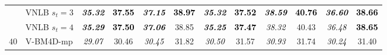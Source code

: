 \documentclass[10pt, journal, twocolumn, final, a4paper]{IEEEtran}
\newcommand{\best}[1]{#1}
\newcommand{\bsic}[1]{\textcolor{black}{\textit{#1}}}
\newcommand{\Bsic}[1]{\textcolor{black}{\textbf{\textit{#1}}}}
\newcommand{\Best}[1]{\textbf{\textcolor{black}{#1}}}
\begin{document}
\begin{table}[htp!]
\begin{center}
{\begin{tabular}{ c | l |c c | c c | c c | c c | c c}
			                      & VNLB   $s_t = 3$     & \Bsic{35.32} & \Best{37.55} & \Bsic{37.15} & \Best{38.97} & \Bsic{35.32} & \Best{37.52} & \Bsic{38.59} & \Best{40.76} & \Bsic{36.60} & \Best{38.66} \\
			                      & VNLB   $s_t = 4$     & \Bsic{35.29} & \Best{37.50} & \Bsic{37.06} & \best{38.85} & \Bsic{35.25} & \Best{37.47} & \bsic{38.32} & \best{40.43} & \bsic{36.48} & \Best{38.65} \\\hline
%
			\multirow{1}{*}{$40$}
			                      & V-BM4D-mp            & \bsic{29.07} &       30.46  & \bsic{30.45} &       31.82  & \bsic{30.50} &       31.57  & \bsic{30.93} &       31.74  & \bsic{30.24} &       31.40  \\

\end{tabular}}
\end{center}
\end{table}
\end{document}
